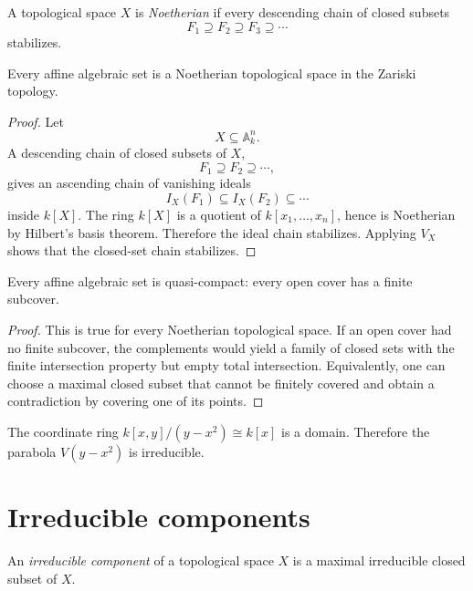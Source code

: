 \begin{definition}
A topological space \(X\) is \emph{Noetherian} if every descending chain of closed subsets
\[
F_1\supseteq F_2\supseteq F_3\supseteq\cdots
\]
stabilizes.
\end{definition}

\begin{theorem}
\label{thm:vi05-affine-noetherian}
Every affine algebraic set is a Noetherian topological space in the Zariski topology.
\end{theorem}

\begin{proof}
Let
\[
X\subseteq\mathbb A_k^n.
\]
A descending chain of closed subsets of \(X\),
\[
F_1\supseteq F_2\supseteq\cdots,
\]
gives an ascending chain of vanishing ideals
\[
I_X(F_1)\subseteq I_X(F_2)\subseteq\cdots
\]
inside \(k[X]\).  The ring \(k[X]\) is a quotient of
\(k[x_1,\dots,x_n]\), hence is Noetherian by Hilbert's basis theorem.  Therefore the ideal
chain stabilizes.  Applying \(V_X\) shows that the closed-set chain stabilizes.
\end{proof}

\begin{corollary}
\label{cor:vi05-quasicompact}
Every affine algebraic set is quasi-compact: every open cover has a finite subcover.
\end{corollary}

\begin{proof}
This is true for every Noetherian topological space.  If an open cover had no finite
subcover, the complements would yield a family of closed sets with the finite intersection
property but empty total intersection.  Equivalently, one can choose a maximal closed subset
that cannot be finitely covered and obtain a contradiction by covering one of its points.
\end{proof}

\begin{example}\label{ex:vi05-expand-02}
The coordinate ring $k[x,y]/(y-x^2)\cong k[x]$ is a domain.  Therefore the parabola $V(y-x^2)$ is irreducible.
\end{example}
\section{Irreducible components}

\begin{definition}
An \emph{irreducible component} of a topological space \(X\) is a maximal irreducible
closed subset of \(X\).
\end{definition}

